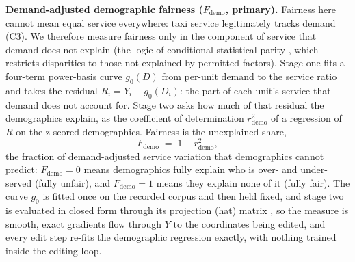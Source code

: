 \textbf{Demand-adjusted demographic fairness ($F_{\mathrm{demo}}$, primary).}
Fairness here cannot mean equal service everywhere: taxi service legitimately
tracks demand (C3). We therefore measure fairness only in the component of
service that demand does not explain (the logic of conditional statistical
parity \cite{corbettdavies2017}, which restricts disparities to those not
explained by permitted factors). Stage one fits a four-term power-basis curve
$g_0(D)$ from per-unit demand to the service ratio and takes the residual
$R_i = Y_i - g_0(D_i)$: the part of each unit's service that demand does not
account for. Stage two asks how much of that residual the demographics
explain, as the coefficient of determination $r^{2}_{\mathrm{demo}}$ of a
regression of $R$ on the z-scored demographics. Fairness is the unexplained
share,
\begin{equation}\label{eq:fdemo}
F_{\mathrm{demo}} \;=\; 1 - r^{2}_{\mathrm{demo}} ,
\end{equation}
the fraction of demand-adjusted service variation that demographics cannot
predict: $F_{\mathrm{demo}} = 0$ means demographics fully explain who is
over- and under-served (fully unfair), and $F_{\mathrm{demo}} = 1$ means
they explain none of it (fully fair). The curve $g_0$ is fitted once on the
recorded corpus and then held fixed, and stage two is evaluated in closed
form through its projection (hat) matrix
\cite{hoaglinwelsch1978}, so the measure is smooth, exact gradients flow
through $Y$ to the coordinates being edited, and every edit step re-fits the
demographic regression exactly, with nothing trained inside the editing loop.
